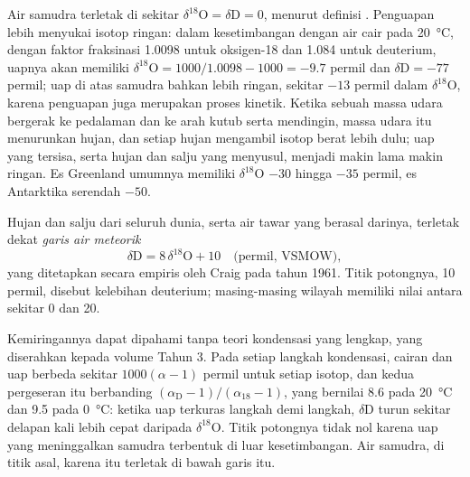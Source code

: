 Air samudra terletak di sekitar $\delta^{18}\mathrm{O} = \delta\mathrm{D} = 0$, menurut
definisi . Penguapan lebih menyukai isotop ringan: dalam kesetimbangan
dengan air cair pada \qty{20}{\degreeCelsius}, dengan faktor fraksinasi
1.0098 untuk oksigen-18 dan 1.084 untuk deuterium, uapnya akan memiliki
$\delta^{18}\mathrm{O} = 1000/1.0098 - 1000 = -9.7$ permil dan $\delta\mathrm{D} =
-77$ permil; uap di atas samudra bahkan lebih ringan, sekitar $-13$ permil
dalam $\delta^{18}\mathrm{O}$, karena penguapan juga merupakan proses kinetik.
Ketika sebuah massa udara bergerak ke pedalaman dan ke arah kutub serta mendingin, massa udara itu menurunkan hujan, dan
setiap hujan mengambil isotop berat lebih dulu; uap yang tersisa, serta hujan dan
salju yang menyusul, menjadi makin lama makin ringan. Es Greenland umumnya memiliki
$\delta^{18}\mathrm{O}$ $-30$ hingga $-35$ permil, es Antarktika serendah $-50$.

\begin{proposition}\label{prop:b2:isotope-geochemistry:mwl}
Hujan dan salju dari seluruh dunia, serta air tawar yang berasal darinya,
terletak dekat \emph{garis air meteorik}
\[
  \delta\mathrm{D} = 8\,\delta^{18}\mathrm{O} + 10 \quad\text{(permil, VSMOW)},
\]
yang ditetapkan secara empiris oleh Craig pada tahun 1961. Titik potongnya, 10 permil, disebut
kelebihan deuterium; masing-masing wilayah memiliki nilai antara sekitar 0 dan 20.
\end{proposition}
\admitted

\noindent Kemiringannya dapat dipahami tanpa teori kondensasi yang lengkap,
yang diserahkan kepada volume Tahun 3. Pada setiap langkah kondensasi, cairan
dan uap berbeda sekitar $1000(\alpha - 1)$ permil untuk setiap isotop, dan
kedua pergeseran itu berbanding $(\alpha_{\mathrm D}-1)/(\alpha_{18}-1)$, yang
bernilai 8.6 pada \qty{20}{\degreeCelsius} dan 9.5 pada \qty{0}{\degreeCelsius}: ketika
uap terkuras langkah demi langkah, $\delta\mathrm{D}$ turun sekitar delapan kali lebih cepat
daripada $\delta^{18}\mathrm{O}$. Titik potongnya tidak nol karena uap yang meninggalkan
samudra terbentuk di luar kesetimbangan. Air samudra, di titik asal, karena itu terletak
di bawah garis itu.

